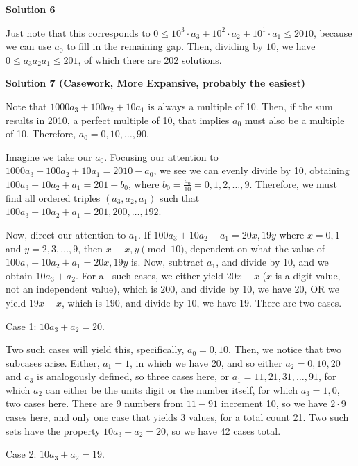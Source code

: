 \begin{enumerate}
 



\textbf{Solution 6}

Just note that this corresponds to $0 \leq 10^3 \cdot a_3 + 10^2 \cdot a_2 + 10^1 \cdot a_1 \leq 2010$, because we can use $a_0$ to fill in the remaining gap. Then, dividing by $10$, we have $0 \leq \overline{a_3 a_2 a_1} \leq 201$, of which there are $\boxed{202}$ solutions.

 



\textbf{Solution 7 (Casework, More Expansive, probably the easiest)}

Note that $1000a_3 + 100a_2 + 10a_1$ is always a multiple of 10. Then, if the sum results in 2010, a perfect multiple of 10, that implies $a_0$ must also be a multiple of 10. Therefore, $a_0 = 0, 10, \dots, 90$.

 Imagine we take our $a_0$. Focusing our attention to $1000a_3 + 100a_2 + 10a_1 = 2010 - a_0$, we see we can evenly divide by 10, obtaining $100a_3 + 10a_2 + a_1 = 201-b_0$, where $b_0 = \frac{a_0}{10} = 0, 1, 2, \dots, 9$. Therefore, we must find all ordered triples $(a_3, a_2, a_1)$ such that $100a_3 + 10a_2 + a_1 = 201, 200, \dots, 192$.

 Now, direct our attention to $a_1$. If $100a_3 + 10a_2 + a_1 = 20x, 19y$ where $x = 0, 1$ and $y = 2, 3, \dots, 9$, then $x \equiv x,y \pmod{10}$, dependent on what the value of $100a_3 + 10a_2 + a_1 = 20x, 19y$ is. Now, subtract $a_1$, and divide by 10, and we obtain $10a_3 + a_2$. For all such cases, we either yield $20x - x$ ($x$ is a digit value, not an independent value), which is $200$, and divide by 10, we have 20, OR we yield $19x-x$, which is $190$, and divide by 10, we have 19. There are two cases.

 Case 1: $10a_3 + a_2 = 20$.

 Two such cases will yield this, specifically, $a_0 = 0, 10$. Then, we notice that two subcases arise. Either, $a_1 = 1$, in which we have 20, and so either $a_2 = 0, 10, 20$ and $a_3$ is analogously defined, so three cases here, or $a_1 = 11, 21, 31, \dots, 91$, for which $a_2$ can either be the units digit or the number itself, for which $a_3 = 1,0$, two cases here. There are 9 numbers from $11 - 91$ increment 10, so we have $2 \cdot 9$ cases here, and only one case that yields 3 values, for a total count 21. Two such sets have the property $10a_3 + a_2 = 20$, so we have 42 cases total.

 Case 2: $10a_3 + a_2 = 19$. 


\end{enumerate}
